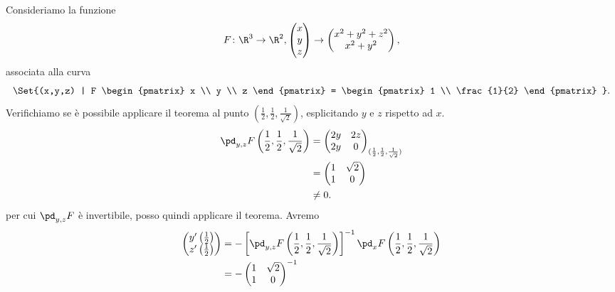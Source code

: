 \begin{ese}
	Consideriamo la funzione
	\[
		F\colon\R^3\to\R^2,
		\begin{pmatrix}
			x \\
			y \\
			z
		\end{pmatrix}
		\to
		\begin{pmatrix}
			x^2+y^2+z^2 \\
			x^2+y^2
		\end{pmatrix}
		,
	\]
	associata alla curva
	\[
		\Set{(x,y,z) | F
			\begin{pmatrix}
				x \\
				y \\
				z
			\end{pmatrix}
			=
			\begin{pmatrix}
				1 \\
				\frac{1}{2}
			\end{pmatrix}
		}.
	\]
	Verifichiamo se è possibile applicare il teorema al punto \((\frac{1}{2},\frac{1}{2},\frac{1}{\sqrt{2}})\), esplicitando \(y\) e \(z\) rispetto ad \(x\).
	\[
		\begin{split}
			\pd_{y,z}F\left(\frac{1}{2},\frac{1}{2},\frac{1}{\sqrt{2}}\right) & =
			\begin{pmatrix}
				2y & 2z \\
				2y & 0
			\end{pmatrix}_{(\frac{1}{2},\frac{1}{2},\frac{1}{\sqrt{2}})}
			\\
			& =
			\begin{pmatrix}
				1 & \sqrt{2} \\
				1 & 0
			\end{pmatrix}
			\\
			& \neq 0.
		\end{split}
	\]
	per cui \(\pd_{y,z}F\) è invertibile, posso quindi applicare il teorema.
	Avremo
	\[
		\begin{split}
			\begin{pmatrix}
				y'\left(\frac{1}{2}\right) \\
				z'\left(\frac{1}{2}\right)
			\end{pmatrix}
			& =-\left[\pd_{y,z}F\left(\frac{1}{2},\frac{1}{2},\frac{1}{\sqrt{2}}\right)\right]^{-1}\pd_x F\left(\frac{1}{2},\frac{1}{2},\frac{1}{\sqrt{2}}\right)\\
			& =-
			\begin{pmatrix}
				1 & \sqrt{2} \\
				1 & 0
			\end{pmatrix}^{-1}

\end{split}\]
\end{ese}
